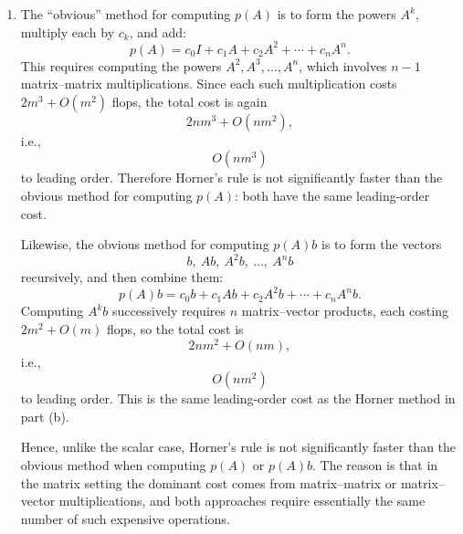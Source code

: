 \documentclass{ctexart}
\begin{document}
\begin{solution}
\begin{enumerate}[label=(\alph*)]
      This is far better than part (a), since it reduces the cost from order
      \(m^3\) per step to order \(m^2\) per step.

    \item The ``obvious'' method for computing \(p(A)\) is to form the powers
      \(A^k\), multiply each by \(c_k\), and add:
      \[
        p(A) = c_0 I + c_1 A + c_2 A^2 + \cdots + c_n A^n.
      \]
      This requires computing the powers \(A^2, A^3, \dots, A^n\), which involves
      \(n-1\) matrix--matrix multiplications. Since each such multiplication costs
      \(2m^3 + O(m^2)\) flops, the total cost is again
      \[
        2nm^3 + O(nm^2),
      \]
      i.e.,
      \[
        \boxed{O(nm^3)}
      \]
      to leading order. Therefore Horner's rule is not significantly faster than
      the obvious method for computing \(p(A)\): both have the same leading-order
      cost.

      Likewise, the obvious method for computing \(p(A)b\) is to form the vectors
      \[
        b,\ Ab,\ A^2b,\ \dots,\ A^n b
      \]
      recursively, and then combine them:
      \[
        p(A)b = c_0 b + c_1 Ab + c_2 A^2b + \cdots + c_n A^n b.
      \]
      Computing \(A^k b\) successively requires \(n\) matrix--vector products, each
      costing \(2m^2 + O(m)\) flops, so the total cost is
      \[
        2nm^2 + O(nm),
      \]
      i.e.,
      \[
        \boxed{O(nm^2)}
      \]
      to leading order. This is the same leading-order cost as the Horner method
      in part (b).

      Hence, unlike the scalar case, Horner's rule is not significantly faster than
      the obvious method when computing \(p(A)\) or \(p(A)b\). The reason is that
      in the matrix setting the dominant cost comes from matrix--matrix or
      matrix--vector multiplications, and both approaches require essentially the
      same number of such expensive operations.
  \end{enumerate}
\end{solution}
\end{document}
